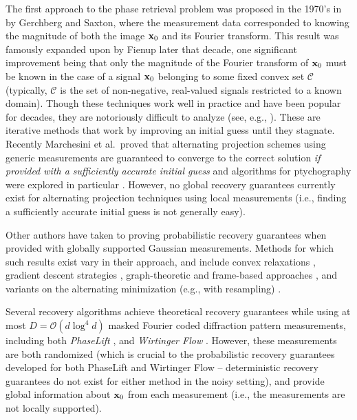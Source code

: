 The first approach to the phase retrieval problem was proposed in the 1970's in \cite{gerchberg1972practical} by Gerchberg and Saxton, where the measurement data corresponded to knowing the magnitude of both the image $\mathbf x_0$ and its Fourier transform.  This result was famously expanded upon by Fienup \cite{fienup1978reconstruction} later that decade, one significant improvement being that only the magnitude of the Fourier transform of $\mathbf x_0$ must be known in the case of a signal $\mathbf x_0$ belonging to some fixed convex set $\mathcal{C}$ (typically, $\mathcal{C}$ is the set of non-negative, real-valued signals restricted to a known domain).  Though these techniques work well in practice and have been popular for decades, they are notoriously difficult to analyze (see, e.g., \cite{bauschke2003hybrid,bauschke2002phase,elser2003phase,takajo1997numerical,takajo1999further,takajo1998study}).  These are  iterative methods that work by improving an initial guess until they stagnate.  Recently Marchesini et al.~proved that alternating projection schemes using generic measurements are guaranteed to converge to the correct solution {\em if provided with a sufficiently accurate initial guess} and algorithms for ptychography were explored in particular \cite{marchesini2015alternating}.  However, no global recovery guarantees currently exist for alternating projection techniques using local measurements (i.e., finding a sufficiently accurate initial guess is not generally easy).

Other authors have taken to proving probabilistic recovery guarantees when provided with globally supported Gaussian measurements.  Methods for which such results exist vary in their approach, and include convex relaxations \cite{candes2014solving,candes2012phaselift}, gradient descent strategies \cite{candes2015phase}, graph-theoretic  \cite{alexeev2014phase} and frame-based approaches \cite{balan2009painless, bodmann2013stable}, and variants on the alternating minimization (e.g., with resampling) \cite{netrapalli2013phase}.

Several recovery algorithms achieve theoretical recovery guarantees while using at most $D = \mathcal{O}(d \log^4 d)$ masked Fourier coded diffraction pattern measurements, including both {\em PhaseLift} \cite{Candes2014WF,gross2015improved}, and {\em Wirtinger Flow} \cite{candes2015phase}.  However, these measurements are both randomized (which is crucial to the probabilistic recovery guarantees developed for both PhaseLift and Wirtinger Flow -- deterministic recovery guarantees do not exist for either method in the noisy setting), and provide global information about $\mathbf x_0$ from each measurement (i.e., the measurements are not locally supported).

